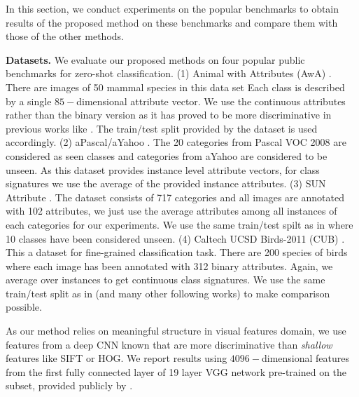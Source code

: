 \documentclass[10pt,twocolumn,letterpaper]{article}
\begin{document}
In this section, we conduct experiments on the popular benchmarks to obtain results of the proposed method on these benchmarks and compare them with those of the other methods.

\textbf{Datasets.}
We evaluate our proposed methods on four popular public benchmarks for zero-shot classification.
(1) Animal with Attributes (AwA) \cite{lampert09}. There are images of 50 mammal species in this data set
Each class is described by a single $85-$dimensional attribute vector. We use the continuous attributes rather than
the binary version as it has proved to be more discriminative in previous works like \cite{Akata2015}. The train/test split provided by the dataset is used accordingly.
(2) aPascal/aYahoo \cite{farhadi09}. The 20 categories from Pascal VOC 2008 \cite{pascal} are considered as seen classes and
categories from aYahoo are considered to be unseen. As this dataset provides instance level attribute vectors,
for class signatures we use the average of the provided instance attributes.
(3) SUN Attribute \cite{sun}. The dataset consists of 717 categories and all images are annotated with 102 attributes, we just
use the average attributes among all instances of each categories for our experiments. We use the same train/test spilt
as in \cite{jayaraman14} where 10 classes have been considered unseen.
(4) Caltech UCSD Birds-2011 (CUB) \cite{cub}. This a dataset for fine-grained classification task. There are 200 species of
birds where each image has been annotated with 312 binary attributes. Again, we average over instances to get continuous class signatures.
We use the same train/test split as in \cite{akata13} (and many other following works) to make comparison possible.

As our method relies on meaningful structure in visual features domain, we use features from a deep CNN known that are
 more discriminative than \textit{shallow} features like SIFT or HOG. We report results using
  $4096-$dimensional features from the first fully connected layer of 19 layer VGG network \cite{vgg}
pre-trained on the subset, provided publicly by \cite{sse}.
\end{document}
